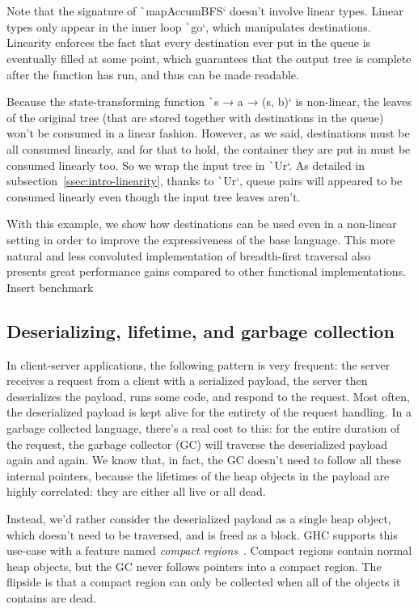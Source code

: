 \documentclass[english]{jflart}
\newcommand{\TODO}[1]{{\color{red}\large #1}}
\begin{document}
Note that the signature of \texttt`mapAccumBFS` doesn't involve linear types. Linear types only appear in the inner loop \texttt`go`, which manipulates destinations. Linearity enforces the fact that every destination ever put in the queue is eventually filled at some point, which guarantees that the output tree is complete after the function has run, and thus can be made readable.

Because the state-transforming function \texttt`s → a → (s, b)` is non-linear, the leaves of the original tree (that are stored together with destinations in the queue) won't be consumed in a linear fashion. However, as we said, destinations must be all consumed linearly, and for that to hold, the container they are put in must be consumed linearly too. So we wrap the input tree in \texttt`Ur`. As detailed in subsection~\ref{ssec:intro-linearity}, thanks to \texttt`Ur`, queue pairs will appeared to be consumed linearly even though the input tree leaves aren't. 

With this example, we show how destinations can be used even in a non-linear setting in order to improve the expressiveness of the base language. This more natural and less convoluted implementation of breadth-first traversal also presents great performance gains compared to other functional implementations. \TODO{Insert benchmark}

\subsection{Deserializing, lifetime, and garbage collection}\label{ssec:parser-sexpr}

In client-server applications, the following pattern is very frequent: the server receives a request from a client with a serialized payload, the server then deserializes the payload, runs some code, and respond to the request. Most often, the deserialized payload is kept alive for the entirety of the request handling. In a garbage collected language, there's a real cost to this: for the entire duration of the request, the garbage collector (GC) will traverse the deserialized payload again and again. We know that, in fact, the GC doesn't need to follow all these internal pointers, because the lifetimes of the heap objects in the payload are highly correlated: they are either all live or all dead.

Instead, we'd rather consider the deserialized payload as a single heap object, which doesn't need to be traversed, and is freed as a block. GHC supports this use-case with a feature named \emph{compact regions}~\cite{yang_efficient_2015}. Compact regions contain normal heap objects, but the GC never follows pointers into a compact region. The flipside is that a compact region can only be collected when all of the objects it contains are dead.
\end{document}
